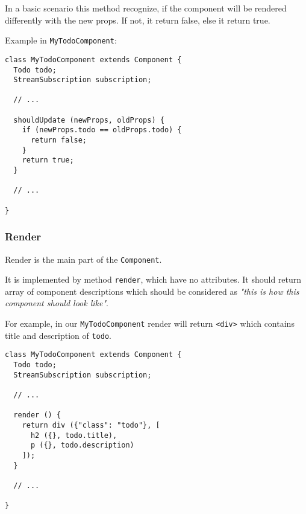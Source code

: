 \documentclass[oneside, 12pt]{book}
\begin{document}
      In a basic scenario this method recognize, 
      if the component will be rendered differently with the new props.  
      If not, it return false, else it return true.

      Example in \texttt{MyTodoComponent}:
      \begin{verbatim}
class MyTodoComponent extends Component {
  Todo todo;
  StreamSubscription subscription;

  // ...

  shouldUpdate (newProps, oldProps) {
    if (newProps.todo == oldProps.todo) {
      return false;
    }
    return true;
  }

  // ...

}
      \end{verbatim}





    \subsubsection{Render}\label{subsec:our-architecture-lifecycle-render}

      Render is the main part of the \texttt{Component}. 

      It is implemented by method \texttt{render}, which have no attributes.
      It should return array of component descriptions which should be considered as 
      \textit{"this is how this component should look like"}.

      For example, in our \texttt{MyTodoComponent} render will return \texttt{<div>} which contains title and description of \texttt{todo}.
      \begin{verbatim}
class MyTodoComponent extends Component {
  Todo todo;
  StreamSubscription subscription;

  // ...

  render () {
    return div ({"class": "todo"}, [
      h2 ({}, todo.title),
      p ({}, todo.description)
    ]);
  }

  // ...

}
      \end{verbatim}


\end{document}
